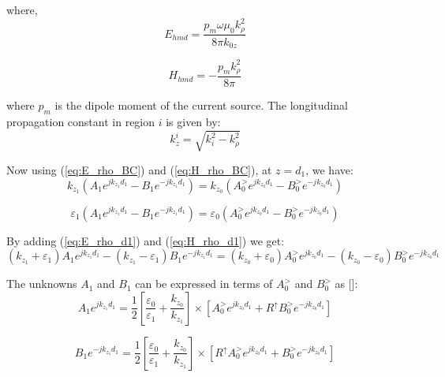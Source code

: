 \documentclass{article}
\begin{document}
  where,
  \begin{equation}
    E_{hmd} = \frac{p_m \omega \mu_0 k_{\rho}^2}{8 \pi k_{0z}}
    \label{eq:E_hmd}
  \end{equation}

  \begin{equation}
    H_{hmd} = -\frac{p_m k_{\rho}^2}{8 \pi}
    \label{eq:H_hmd}
  \end{equation}

  where $p_m$ is the dipole moment of the current source. The longitudinal propagation constant in region $i$ is given by:
  \begin{equation}
    k_z^i = \sqrt{k_i^2 - k_{\rho}^2}
    \label{eq:k}
  \end{equation}

  Now using (\ref{eq:E_rho_BC}) and (\ref{eq:H_rho_BC}), at $z=d_1$, we have:
  \begin{equation}
    k_{z_1} \left( A_1 e^{jk_{z_1} d_1} - B_1 e^{-jk_{z_1} d_1}  \right) = k_{z_0} \left( A_{0}^> e^{jk_{z_0} d_1} - B_{0}^> e^{-jk_{z_0} d_1}  \right)
    \label{eq:E_rho_d1}
  \end{equation}

  \begin{equation}
    \varepsilon_1 \left( A_1 e^{jk_{z_1} d_1} - B_1 e^{-jk_{z_1} d_1}  \right) = \varepsilon_{0} \left( A_{0}^> e^{jk_{z_0} d_1} - B_{0}^> e^{-jk_{z_0} d_1}  \right)
    \label{eq:H_rho_d1}
  \end{equation}

  By adding (\ref{eq:E_rho_d1}) and (\ref{eq:H_rho_d1}) we get:
  \begin{equation}
    \left( k_{z_1} + \varepsilon_1 \right) A_1 e^{jk_{z_1} d_1} - \left( k_{z_1} - \varepsilon_1 \right) B_1 e^{-jk_{z_1} d_1}  = \left( k_{z_0} + \varepsilon_0 \right) A_0^> e^{jk_{z_0} d_1} - \left( k_{z_0} - \varepsilon_0 \right) B_0^> e^{-jk_{z_0} d_1}
    \label{eq:sum}
  \end{equation}

  The unknowns $A_1$ and $B_1$ can be expressed in terms of $A_0^>$ and $B_0^>$ as [\cite{kong1990electromagnetic}]:
  \begin{equation}
    A_1 e^{jk_{z_1} d_1} = \frac{1}{2} \left[ \frac{\varepsilon_0}{\varepsilon_1} + \frac{k_{z_0}}{k_{z_1}} \right] \times \left[  A_0^> e^{jk_{z_0} d_1} + R^{\uparrow} B_0^> e^{-jk_{z_0} d_1} \right]
    \label{eq:A_1}
  \end{equation}

  \begin{equation}
    B_1 e^{-jk_{z_1} d_1} = \frac{1}{2} \left[ \frac{\varepsilon_0}{\varepsilon_1} + \frac{k_{z_0}}{k_{z_1}} \right] \times \left[R^{\uparrow}  A_0^> e^{jk_{z_0} d_1} + B_0^> e^{-jk_{z_0} d_1} \right]
    \label{eq:B_1}
  \end{equation}
\end{document}

